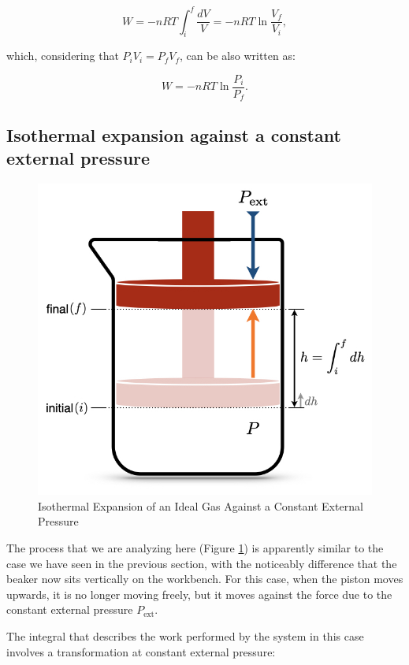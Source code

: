 \documentclass[
]{book}
\theoremstyle{definition}
\theoremstyle{definition}
\theoremstyle{definition}
\theoremstyle{remark}
\begin{document}
\begin{equation}
  W = - nRT \int_{i}^{f} \frac{dV}{V} = -nRT \ln \frac{V_f}{V_i},
  \label{eq:WintsolvedV}
\end{equation}

which, considering that \(P_iV_i=P_fV_f\), can be also written as:

\begin{equation}
  W = -nRT \ln \frac{P_i}{P_f}.
  \label{eq:WintsolvedP}
\end{equation}

\hypertarget{isothermal-expansion-against-a-constant-external-pressure}{%
\subsection{Isothermal expansion against a constant external pressure}\label{isothermal-expansion-against-a-constant-external-pressure}}

\begin{figure}

{\centering \includegraphics[width=0.5\linewidth]{./img/OEP_Figures.004} 

}

\caption{Isothermal Expansion of an Ideal Gas Against a Constant External Pressure}\label{fig:Fig2c3}
\end{figure}

The process that we are analyzing here (Figure \ref{fig:Fig2c3}) is apparently similar to the case we have seen in the previous section, with the noticeably difference that the beaker now sits vertically on the workbench. For this case, when the piston moves upwards, it is no longer moving freely, but it moves against the force due to the constant external pressure \(P_{\text{ext}}\).

The integral that describes the work performed by the system in this case involves a transformation at constant external pressure:
\end{document}
